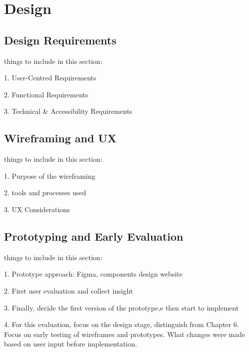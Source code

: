 \chapter{Design}
\section{Design Requirements}
things to include in this section:

1. User-Centred Requirements

2. Functional Requirements

3. Technical \& Accessibility Requirements

\section{Wireframing and UX}
things to include in this section:

1. Purpose of the wireframing

2. tools and processes used

3. UX Considerations
\section{Prototyping and Early Evaluation}
things to include in this section:

1. Prototype approach: Figma, components design website

2. First user evaluation and collect insight

3. Finally, decide the first version of the prototype,e then start to implement

4. For this evaluation, focus on the design stage, distinguish from Chapter 6. Focus on early testing of wireframes and prototypes. What changes were made based on user input before implementation.